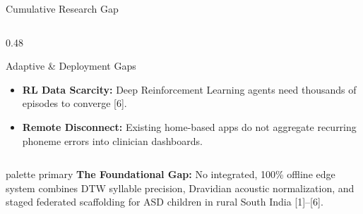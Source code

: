 \documentclass[aspectratio=169, 11pt, xcolor=table]{beamer}
\begin{document}
\begin{frame}{Cumulative Research Gap}
\begin{columns}[T, totalwidth=\textwidth]
\begin{column}{0.48\textwidth}
            \vspace{1mm}

            \begin{block}{Adaptive \& Deployment Gaps}
                \tiny
                \begin{itemize}
                    \setlength{\itemsep}{2pt}
                    \item \textbf{RL Data Scarcity:} Deep Reinforcement Learning agents need thousands of episodes to converge [6].
                    \item \textbf{Remote Disconnect:} Existing home-based apps do not aggregate recurring phoneme errors into clinician dashboards.
                \end{itemize}
            \end{block}
        \end{column}
    \end{columns}

    \vspace{2mm}
    \begin{beamercolorbox}[sep=3pt, center, rounded=true]{palette primary}
        \tiny \textbf{The Foundational Gap:} No integrated, 100\% offline edge system combines DTW syllable precision, Dravidian acoustic normalization, and staged federated scaffolding for ASD children in rural South India [1]--[6].
    \end{beamercolorbox}
\end{frame}
\end{document}
